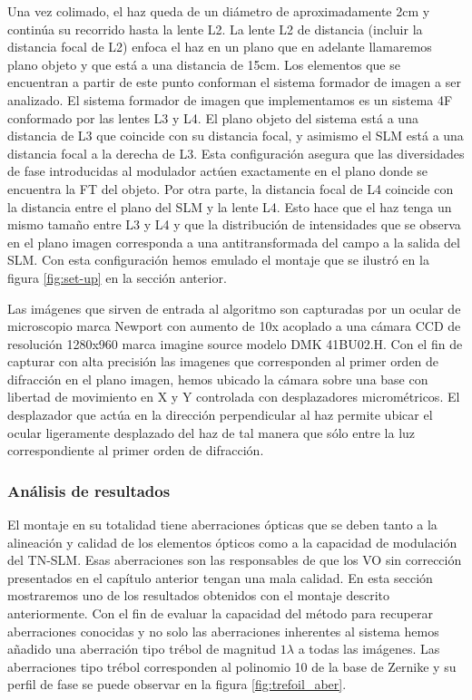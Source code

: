 Una vez colimado, el haz queda de un
 diámetro de aproximadamente 2cm y continúa su recorrido hasta la
 lente L2. La lente L2 de distancia (incluir la distancia focal de L2) enfoca el haz en un
 plano que en adelante llamaremos plano objeto y que está a una
 distancia de 15cm. Los elementos que se encuentran a partir de este
 punto conforman el sistema formador de imagen a ser
 analizado.
El sistema formador de imagen
 que implementamos es un sistema 4F conformado por las lentes L3 y
 L4. El plano objeto del sistema está a una distancia de L3 que coincide con su
 distancia focal, y asimismo el SLM está a una distancia focal a la
 derecha de L3. Esta configuración asegura que las diversidades de fase introducidas al modulador actúen
 exactamente en el plano donde se encuentra la FT del objeto.       
Por otra parte, la distancia focal de L4 coincide con la distancia
entre el plano del SLM y la lente L4. Esto hace que el haz tenga un
mismo tamaño entre L3 y L4 y que la distribución de intensidades que
se observa en el plano imagen corresponda a una antitransformada del
campo a la salida del SLM. Con esta configuración hemos emulado el
montaje que se ilustró en la figura \ref{fig:set-up} en la sección
anterior. 

Las imágenes que sirven de entrada al algoritmo son capturadas por un
ocular de microscopio marca Newport con aumento de 10x acoplado a una cámara
CCD de resolución 1280x960 marca imagine source modelo DMK
41BU02.H. Con el fin de capturar con alta precisión las imagenes que corresponden al
primer orden de difracción en el plano imagen, hemos ubicado la cámara
sobre una base con libertad de movimiento en X y Y controlada con
desplazadores micrométricos. El desplazador que actúa en la dirección
perpendicular al haz permite ubicar el ocular ligeramente desplazado
del haz de tal manera que sólo entre la luz correspondiente al primer
orden de difracción. 

\subsubsection{Análisis de resultados}

El montaje en su totalidad tiene aberraciones ópticas que se deben
tanto a la alineación y calidad de los elementos ópticos como a la
capacidad de modulación del TN-SLM. Esas aberraciones son las
responsables de que los VO sin corrección presentados en el capítulo
anterior tengan una mala calidad. En esta sección mostraremos uno de
los resultados obtenidos con el montaje descrito anteriormente. Con el
fin de evaluar la capacidad del método para recuperar aberraciones
conocidas y no solo las aberraciones inherentes al sistema hemos
añadido una aberración tipo trébol de magnitud $1\lambda$ a todas las
imágenes. Las aberraciones tipo trébol corresponden al
polinomio 10 de la base de Zernike y su perfil de fase se puede
observar en la figura \ref{fig:trefoil_aber}.  

